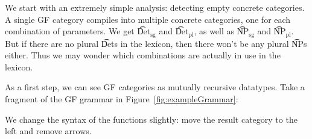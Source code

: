We start with an extremely simple analysis: detecting empty concrete
categories. A single GF category compiles into multiple concrete
categories, one for each combination of parameters. We get \t{Det$_{\text{sg}}$} and \t{Det$_{\text{pl}}$}, as well as \t{NP$_{\text{sg}}$} and \t{NP$_{\text{pl}}$}. But if there are no plural \t{Det}s in the lexicon, then there won't be any plural \t{NP}s either. Thus we may wonder
which combinations are actually in use in the lexicon.

As a first step, we can see GF categories as mutually recursive
datatypes. Take a fragment of the GF grammar in Figure~\ref{fig:exampleGrammar}:

\begin{EmptyItem}
\begin{Highlighting}[]
   \NormalTok{; } \NormalTok{; } \NormalTok{; } \NormalTok{; } \NormalTok{;}
   \FunctionTok{:}  \OtherTok{->}  \OtherTok{->}  \NormalTok{;}
    \FunctionTok{:}   \OtherTok{->}  \OtherTok{->}  \NormalTok{;}
    \FunctionTok{:}   \OtherTok{->}  \OtherTok{->}  \NormalTok{;}
  \FunctionTok{:}  \NormalTok{;}
  \FunctionTok{:}  \NormalTok{;}
  \FunctionTok{:} 
\end{Highlighting}
\end{EmptyItem}

\noindent We change the syntax of the functions slightly: move the result
category to the left and remove arrows.

\begin{EmptyItem}
\begin{Highlighting}[]
    \OtherTok{::=}   \NormalTok{;}
     \OtherTok{::=}   \FunctionTok{|} \FunctionTok{|} 
     \OtherTok{::=}   \NormalTok{;}
    \OtherTok{::=} \FunctionTok{|} \FunctionTok{|} 
   \OtherTok{::=} \FunctionTok{|} 
\end{Highlighting}
\end{EmptyItem}


